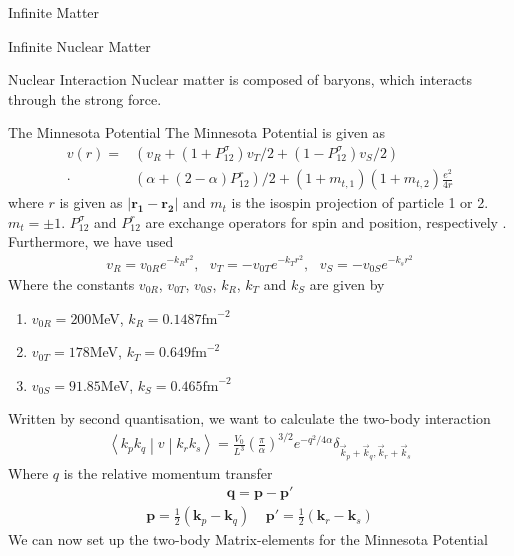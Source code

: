 \documentclass[twoside,english]{uiofysmaster}
\begin{document}
\begin{chapter}{Infinite Matter}
\begin{section}{Infinite Nuclear Matter}
	\end{section}
	\begin{section}{Nuclear Interaction}
		Nuclear matter is composed of baryons, which interacts through the strong force. 
		
		\begin{subsection}{The Minnesota Potential}
			The Minnesota Potential is given as
			\begin{align}
				v(r) = &\left(v_R + (1 + P_{12}^\sigma) v_T/2 + (1 - P_{12}^\sigma) v_S/2 \right) \\
					   \cdot &\left( \alpha + (2- \alpha)P_{12}^r \right)/2 + (1+m_{t,1})(1+m_{t,2})\frac{e^2}{4r}
			\end{align}
			where $r$ is given as $\left| \mathbf{r_1} - \mathbf{r_2} \right|$ and $m_t$ is the isospin projection of particle 1 or 2. $m_t = \pm 1$. 
			$P_{12}^\sigma $ and $P_{12}^r$ are exchange operators for spin and position, respectively \cite{Baardsen}. Furthermore, we have used
			\begin{align} 
				v_R = v_{0R}e^{-k_R r^2}, \:\:\: v_T = -v_{0T} e^{-k_Tr^2}, \:\:\: v_S = -v_{0S}e^{-k_sr^2}
			\end{align}
			Where the constants $v_{0R}$, $v_{0T}$, $v_{0S}$, $k_R$, $k_T$ and $k_S$ are given by \cite{Thompson1977}
			\begin{enumerate}
				\item $v_{0R} = 200$MeV,  $k_R = 0.1487 \text{fm}^{-2}$
				\item $v_{0T} = 178$MeV,  $k_T = 0.649 \text{fm}^{-2}$
				\item $v_{0S} = 91.85$MeV, $k_S = 0.465 \text{fm}^{-2}$
			\end{enumerate}
			Written by second quantisation, we want to calculate the two-body interaction
			\begin{align}
			 	\left<k_p k_q \middle| v \middle| k_r k_s \right> = \frac{V_0}{L^3} \left(\frac{\pi}{\alpha}\right)^{3/2} e^{-q^2 / 4 \alpha} \delta_{\vec k_p + \vec k_q, \vec k_r + \vec k_s}
			\end{align}
			Where $q$ is the relative momentum transfer
			\begin{align}
				\mathbf{q} = \mathbf{p} - \mathbf{p'} 
			\end{align}
			\begin{align}
				\mathbf{p} = \frac{1}{2} (\mathbf{k}_p - \mathbf{k}_q) \:\:\:\:\: \mathbf{p'} = \frac{1}{2}(\mathbf{k}_r- \mathbf{k}_s) 
			\end{align}
			We can now set up the two-body Matrix-elements for the Minnesota Potential

\end{subsection}
\end{section}
\end{chapter}
\end{document}
